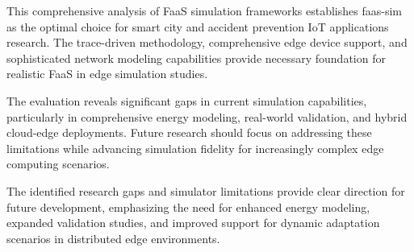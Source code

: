 This comprehensive analysis of FaaS simulation frameworks establishes faas-sim as the optimal choice for smart city and accident prevention IoT applications research. The trace-driven methodology, comprehensive edge device support, and sophisticated network modeling capabilities provide necessary foundation for realistic FaaS in edge simulation studies.

The evaluation reveals significant gaps in current simulation capabilities, particularly in comprehensive energy modeling, real-world validation, and hybrid cloud-edge deployments. Future research should focus on addressing these limitations while advancing simulation fidelity for increasingly complex edge computing scenarios.

The identified research gaps and simulator limitations provide clear direction for future development, emphasizing the need for enhanced energy modeling, expanded validation studies, and improved support for dynamic adaptation scenarios in distributed edge environments.